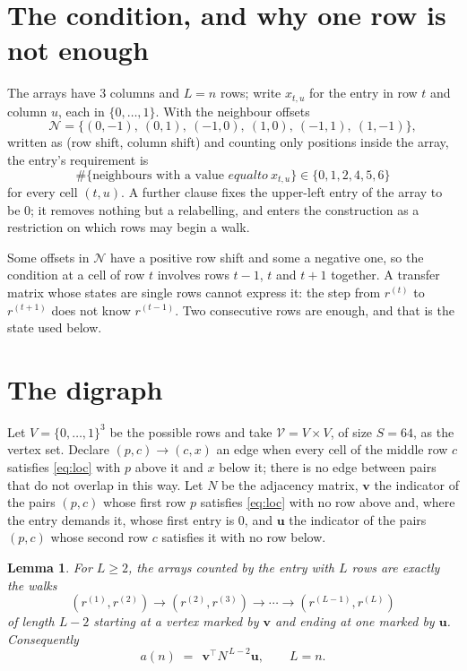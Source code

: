\documentclass[11pt,a4paper]{article}
\theoremstyle{plain}
\newtheorem{lemma}[theorem]{Lemma}
\theoremstyle{definition}
\begin{document}
\section{The condition, and why one row is not enough}

The arrays have $3$ columns and $L=n$ rows; write $x_{t,u}$ for the entry in
row $t$ and column $u$, each in $\{0,\dots,1\}$. With the neighbour offsets
\[
\mathcal N=\{(0,-1),\ (0,1),\ (-1,0),\ (1,0),\ (-1,1),\ (1,-1)\},
\]
written as (row shift, column shift) and counting only positions inside the array, the
entry's requirement is
\begin{equation}\label{eq:loc}
\#\{\text{neighbours with a value }equal to\ x_{t,u}\}\in\{0,1,2,4,5,6\}
\end{equation}
for every cell $(t,u)$. A further clause fixes the upper-left entry of the array to be $0$; it removes nothing but a relabelling, and enters the construction as a restriction on which rows may begin a walk.

Some offsets in $\mathcal N$ have a positive row shift and some a negative one, so the
condition at a cell of row $t$ involves rows $t-1$, $t$ and $t+1$ together. A transfer
matrix whose states are single rows cannot express it: the step from $r^{(t)}$ to
$r^{(t+1)}$ does not know $r^{(t-1)}$. Two consecutive rows are enough, and that is
the state used below.

\section{The digraph}

Let $V=\{0,\dots,1\}^{3}$ be the possible rows and take
$\mathcal V=V\times V$, of size $S=64$, as the vertex set. Declare $(p,c)\to(c,x)$ an edge
when every cell of the middle row $c$ satisfies \eqref{eq:loc} with $p$ above it and $x$
below it; there is no edge between pairs that do not overlap in this way. Let $N$ be the
adjacency matrix, $\mathbf{v}$ the indicator of the pairs $(p,c)$ whose first row $p$
satisfies \eqref{eq:loc} with no row above and, where the entry demands it, whose first entry is $0$, and $\mathbf{u}$ the indicator of
the pairs $(p,c)$ whose second row $c$ satisfies it with no row below.

\begin{lemma}\label{lem:walk}
For $L\ge2$, the arrays counted by the entry with $L$ rows are exactly the walks
\[
(r^{(1)},r^{(2)})\to(r^{(2)},r^{(3)})\to\cdots\to(r^{(L-1)},r^{(L)})
\]
of length $L-2$ starting at a vertex marked by $\mathbf{v}$ and ending at one marked by
$\mathbf{u}$. Consequently
\[
a(n)\;=\;\,\mathbf{v}^{\!\top}N^{\,L-2}\mathbf{u},\qquad L=n .
\]
\end{lemma}
\end{document}
